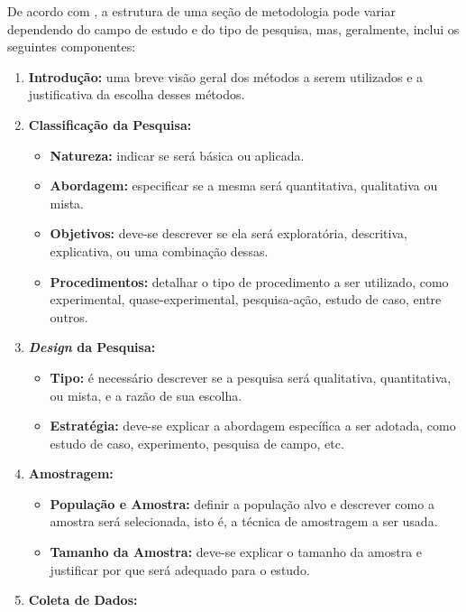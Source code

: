 De acordo com , a estrutura de uma seção de metodologia pode variar dependendo do campo de estudo e do tipo de pesquisa, mas, geralmente, inclui os seguintes componentes:
\begin{enumerate}[label=\roman*., itemsep=0pt, leftmargin=2.3cm]
    \item \textbf{Introdução:} uma breve visão geral dos métodos a serem utilizados e a justificativa da escolha desses métodos.
    \item \textbf{Classificação da Pesquisa:}
        \begin{itemize}[itemsep=0pt]
            \item \textbf{Natureza:} indicar se será básica ou aplicada.
            \item \textbf{Abordagem:} especificar se a mesma será quantitativa, qualitativa ou mista.
            \item \textbf{Objetivos:} deve-se descrever se ela será exploratória, descritiva, explicativa, ou uma combinação dessas.
            \item \textbf{Procedimentos:} detalhar o tipo de procedimento a ser utilizado, como experimental, quase-experimental, pesquisa-ação, estudo de caso, entre outros.
        \end{itemize}
    \item \textbf{\textit{Design} da Pesquisa:}
        \begin{itemize}[itemsep=0pt]
            \item \textbf{Tipo:} é necessário descrever se a pesquisa será qualitativa, quantitativa, ou mista, e a razão de sua escolha.
            \item \textbf{Estratégia:} deve-se explicar a abordagem específica a ser adotada, como estudo de caso, experimento, pesquisa de campo, etc.
        \end{itemize}
   \item \textbf{Amostragem:}
        \begin{itemize}[itemsep=0pt]
            \item \textbf{População e Amostra:} definir a população alvo e descrever como a amostra será selecionada, isto é, a técnica de amostragem a ser usada.
            \item \textbf{Tamanho da Amostra:} deve-se explicar o tamanho da amostra e justificar por que será adequado para o estudo.
        \end{itemize}
   \item \textbf{Coleta de Dados:}
        \begin{itemize}[itemsep=0pt]

\end{itemize}
\end{enumerate}

